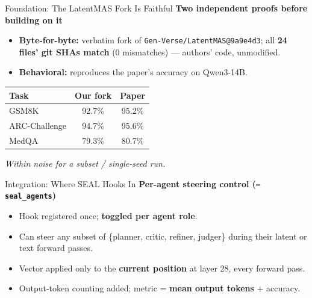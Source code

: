 \documentclass{beamer}
\begin{document}
\begin{frame}{Foundation: The LatentMAS Fork Is Faithful}
    \textbf{Two independent proofs before building on it}
    \begin{itemize}
        \item \textbf{Byte-for-byte:} verbatim fork of \texttt{Gen-Verse/LatentMAS@9a9e4d3}; all \textbf{24 files' git SHAs match} (0 mismatches) --- authors' code, unmodified.
        \item \textbf{Behavioral:} reproduces the paper's accuracy on Qwen3-14B.
    \end{itemize}
    \vspace{0.2cm}
    \begin{table}[]
        \centering
        \begin{tabular}{|l|c|c|}
            \hline
            \textbf{Task} & \textbf{Our fork} & \textbf{Paper} \\ \hline
            GSM8K & 92.7\% & 95.2\% \\ \hline
            ARC-Challenge & 94.7\% & 95.6\% \\ \hline
            MedQA & 79.3\% & 80.7\% \\ \hline
        \end{tabular}
    \end{table}
    \vspace{0.2cm}
    \begin{center}\textit{Within noise for a subset / single-seed run.}\end{center}
\end{frame}

\begin{frame}{Integration: Where SEAL Hooks In}
    \textbf{Per-agent steering control (\texttt{--seal\_agents})}
    \begin{itemize}
        \item Hook registered once; \textbf{toggled per agent role}.
        \item Can steer any subset of \{planner, critic, refiner, judger\} during their latent or text forward passes.
        \item Vector applied only to the \textbf{current position} at layer 28, every forward pass.
        \item Output-token counting added; metric = \textbf{mean output tokens} + accuracy.
    \end{itemize}
\end{frame}
\end{document}
